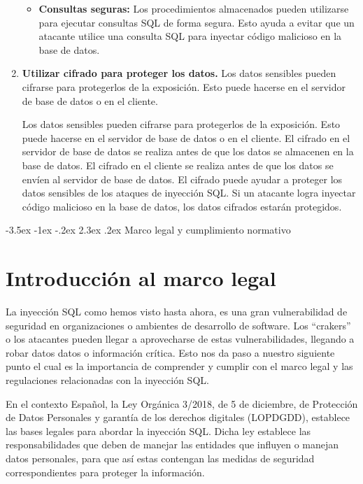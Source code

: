 \documentclass[11pt]{report}
\makeatletter
\renewcommand\chapter{\@startsection{chapter}{0}{\z@}%
    {-3.5ex \@plus -1ex \@minus -.2ex}%
    {2.3ex \@plus.2ex}%
    {\normalfont\Large\bfseries}}
\makeatother
\begin{document}
\begin{enumerate}
\begin{itemize}
    \item \textbf{Consultas seguras:} Los procedimientos almacenados pueden utilizarse para ejecutar consultas SQL de forma segura. Esto
    ayuda a evitar que un atacante utilice una consulta SQL para inyectar código malicioso en la base de datos.
  \end{itemize}

  \item \textbf{Utilizar cifrado para proteger los datos.} Los datos sensibles pueden cifrarse para protegerlos de la exposición. Esto puede
  hacerse en el servidor de base de datos o en el cliente.

  Los datos sensibles pueden cifrarse para protegerlos de la exposición. Esto puede hacerse en el servidor de base de datos o en el cliente.
  El cifrado en el servidor de base de datos se realiza antes de que los datos se almacenen en la base de datos. El cifrado en el cliente se
  realiza antes de que los datos se envíen al servidor de base de datos. El cifrado puede ayudar a proteger los datos sensibles de los ataques
  de inyección SQL. Si un atacante logra inyectar código malicioso en la base de datos, los datos cifrados estarán protegidos.
\end{enumerate}

\chapter{Marco legal y cumplimiento normativo}
\section{Introducción al marco legal}
La inyección SQL como hemos visto hasta ahora, es una gran vulnerabilidad de seguridad en organizaciones o ambientes de desarrollo de software. 
Los “crakers” o los atacantes pueden llegar a aprovecharse de estas vulnerabilidades, llegando a robar datos datos o información crítica. Esto
nos da paso a nuestro siguiente punto el cual es la importancia de comprender y cumplir con el marco legal y las regulaciones relacionadas con
la inyección SQL.

En el contexto Español, la Ley Orgánica 3/2018, de 5 de diciembre, de Protección de Datos Personales y garantía de los derechos digitales (LOPDGDD),
establece las bases legales para abordar la inyección SQL. Dicha ley establece las responsabilidades que deben de manejar las entidades que influyen
o manejan datos personales, para que así estas contengan las medidas de seguridad correspondientes para proteger la información.
\end{document}
